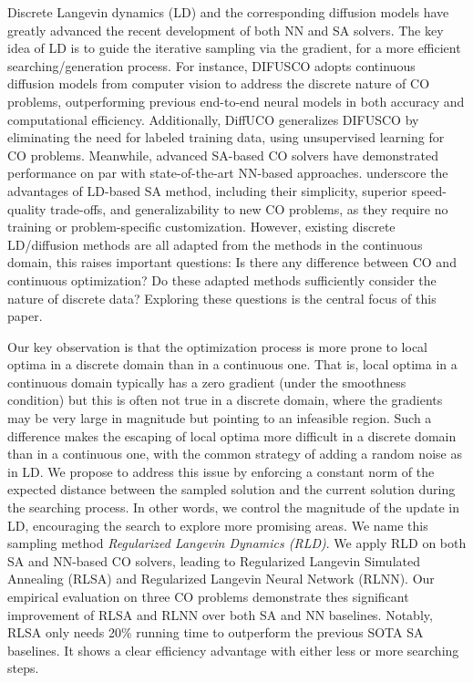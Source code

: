 Discrete Langevin dynamics (LD) \citep{zhang2022langevinlike, sun2022path} and the corresponding diffusion models \citep{chen2023analog, austin2021structured} have greatly advanced the recent development of both NN and SA solvers. The key idea of LD is to guide the iterative sampling via the gradient, for a more efficient searching/generation process. For instance, DIFUSCO \citep{sun2023difusco} adopts continuous diffusion models from computer vision to address the discrete nature of CO problems, outperforming previous end-to-end neural models in both accuracy and computational efficiency. Additionally, DiffUCO \citep{SanokowskiHL24} generalizes DIFUSCO by eliminating the need for labeled training data, using unsupervised learning for CO problems.
Meanwhile, advanced SA-based CO solvers  have demonstrated performance on par with state-of-the-art NN-based approaches.  \citet{sun2023revisiting} underscore the advantages of LD-based SA method, including their simplicity, superior speed-quality trade-offs, and generalizability to new CO problems, as they require no training or problem-specific customization.
However, existing discrete LD/diffusion methods are all adapted from the methods \citep{Welling2011LD, dickstein2015nonequ, song2019generative, Ho2020denoising, song2020improved} in the continuous domain, this raises important questions:  Is there any difference between CO and continuous optimization? Do these adapted methods sufficiently consider the nature of discrete data? Exploring these questions is the central focus of this paper.



Our key observation is that the optimization process is more prone to local optima in a discrete domain than in a continuous one.  That is, local optima in a continuous domain typically has a zero gradient (under the smoothness condition)
but this is often not true in a discrete domain, where the gradients may be very large in magnitude but pointing to an infeasible region. Such a difference makes the escaping of local optima more difficult in a discrete domain than in a continuous one, with the common strategy of  adding a random noise as in LD.  We propose  
to address this issue by enforcing a constant norm of the expected distance between the sampled solution and the current solution during the searching process. In other words, we control the magnitude of the update in LD, encouraging the search to explore more promising areas. We name this sampling method \textit{Regularized Langevin Dynamics (RLD)}. We apply RLD on both SA and NN-based CO solvers, leading to Regularized Langevin Simulated Annealing (RLSA) and Regularized Langevin Neural Network (RLNN).  Our empirical evaluation on three CO problems demonstrate thes significant improvement of RLSA and RLNN over both SA and NN baselines. Notably, RLSA only needs 20\% running time to outperform the previous  SOTA SA baselines. It shows a clear efficiency advantage with either less or more searching steps.


